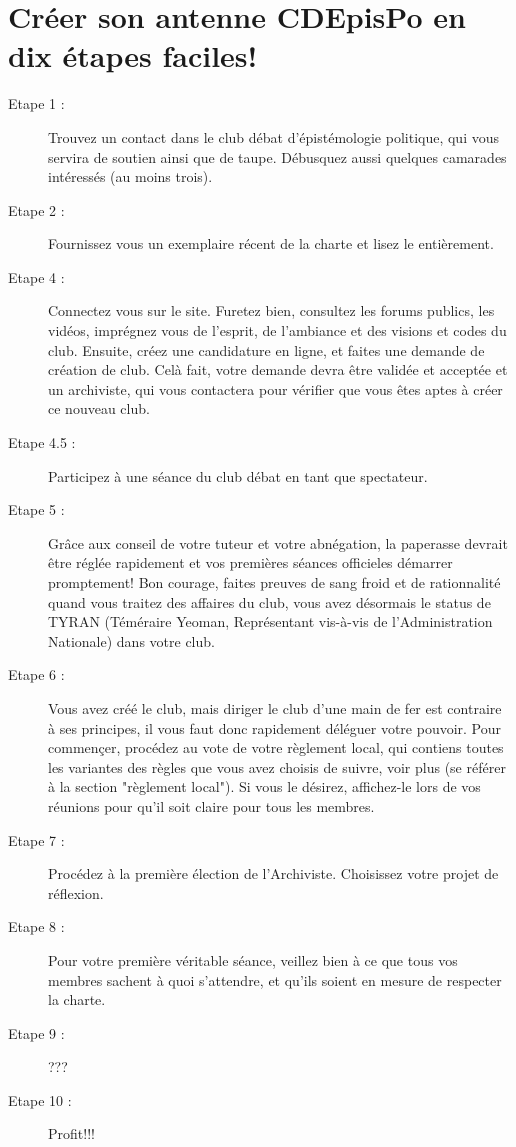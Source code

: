 \documentclass[a4paper,12pt]{article}
\begin{document}
\section{Créer son antenne CDEpisPo en dix étapes faciles!}
\begin{description}
 \item [Etape 1 :] Trouvez un contact dans le club débat d'épistémologie politique, qui vous servira de soutien ainsi que de taupe. Débusquez aussi quelques camarades intéressés (au moins trois).
 \item [Etape 2 :] Fournissez vous un exemplaire récent de la charte et lisez le entièrement.
 \item [Etape 4 :] Connectez vous sur le site. Furetez bien, consultez les forums publics, les vidéos, imprégnez vous de l'esprit, de l'ambiance et des visions et codes du club. Ensuite, créez une candidature en ligne, et faites une demande de création de club. Celà fait, votre demande devra être validée et acceptée et un archiviste, qui vous contactera pour vérifier que vous êtes aptes à créer ce nouveau club.
 \item [Etape 4.5 :] Participez à une séance du club débat en tant que spectateur.
 \item [Etape 5 :] Grâce aux conseil de votre tuteur et votre abnégation, la paperasse devrait être réglée rapidement et vos premières séances officieles démarrer promptement! Bon courage, faites preuves de sang froid et de rationnalité quand vous traitez des affaires du club, vous avez désormais le status de TYRAN (Téméraire Yeoman, Représentant vis-à-vis de l'Administration Nationale) dans votre club.

 \item [Etape 6 :] Vous avez créé le club, mais diriger le club d'une main de fer est contraire à ses principes, il vous faut donc rapidement déléguer votre pouvoir. Pour commençer, procédez au vote de votre règlement local, qui contiens toutes les variantes des règles que vous avez choisis de suivre, voir plus (se référer à la section "règlement local"). Si vous le désirez, affichez-le lors de vos réunions pour qu'il soit claire pour tous les membres. 
 \item [Etape 7 :] Procédez à la première élection de l'Archiviste. Choisissez votre projet de réflexion.
 \item [Etape 8 :] Pour votre première véritable séance, veillez bien à ce que tous vos membres sachent à quoi s'attendre, et qu'ils soient en mesure de respecter la charte.
 \item [Etape 9 :] ???
 \item [Etape 10 :] Profit!!!
\end{description}
\end{document}
